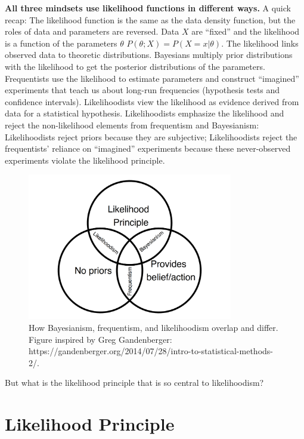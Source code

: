 \documentclass[
  10pt,
]{scrbook}
\begin{document}
\textbf{All three mindsets use likelihood functions in different ways.}
A quick recap: The likelihood function is the same as the data density function, but the roles of data and parameters are reversed.
Data \(X\) are ``fixed'' and the likelihood is a function of the parameters \(\theta\) \(P(\theta; X) = P(X = x | \theta)\).
The likelihood links observed data to theoretic distributions.
Bayesians multiply prior distributions with the likelihood to get the posterior distributions of the parameters.
Frequentists use the likelihood to estimate parameters and construct ``imagined'' experiments that teach us about long-run frequencies (hypothesis tests and confidence intervals).
Likelihoodists view the likelihood as evidence derived from data for a statistical hypothesis.
Likelihoodists emphasize the likelihood and reject the non-likelihood elements from frequentism and Bayesianism:
Likelihoodists reject priors because they are subjective;
Likelihoodists reject the frequentists' reliance on ``imagined'' experiments because these never-observed experiments violate the likelihood principle.

\begin{figure}

{\centering \includegraphics[width=0.8\textwidth]{figures/three-stat-mindsets-1} 

}

\caption{How Bayesianism, frequentism, and likelihoodism overlap and differ. Figure inspired by Greg Gandenberger: https://gandenberger.org/2014/07/28/intro-to-statistical-methods-2/.}\label{fig:three-stat-mindsets}
\end{figure}

But what is the likelihood principle that is so central to likelihoodism?

\hypertarget{likelihood-principle}{%
\section{Likelihood Principle}\label{likelihood-principle}}
\end{document}
